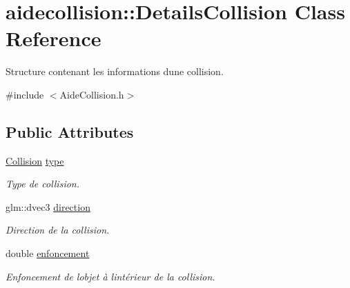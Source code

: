 \hypertarget{classaidecollision_1_1_details_collision}{}\section{aidecollision\+:\+:Details\+Collision Class Reference}
\label{classaidecollision_1_1_details_collision}


Structure contenant les informations d\textquotesingle{}une collision.  




{\ttfamily \#include $<$Aide\+Collision.\+h$>$}

\subsection*{Public Attributes}
\begin{DoxyCompactItemize}
\item 
\hypertarget{classaidecollision_1_1_details_collision_a524989691331ea39d2c14c639f0de02e}{}\hyperlink{namespaceaidecollision_a1c8613e2393aa3268262f9d23d60c0c9}{Collision} \hyperlink{classaidecollision_1_1_details_collision_a524989691331ea39d2c14c639f0de02e}{type}\label{classaidecollision_1_1_details_collision_a524989691331ea39d2c14c639f0de02e}

\begin{DoxyCompactList}\small\item\em Type de collision. \end{DoxyCompactList}\item 
\hypertarget{classaidecollision_1_1_details_collision_ab68965d1c0583cc9a28973bc5b3060b8}{}glm\+::dvec3 \hyperlink{classaidecollision_1_1_details_collision_ab68965d1c0583cc9a28973bc5b3060b8}{direction}\label{classaidecollision_1_1_details_collision_ab68965d1c0583cc9a28973bc5b3060b8}

\begin{DoxyCompactList}\small\item\em Direction de la collision. \end{DoxyCompactList}\item 
\hypertarget{classaidecollision_1_1_details_collision_a6aa4cae3f313a2a16608dd60da0f97d1}{}double \hyperlink{classaidecollision_1_1_details_collision_a6aa4cae3f313a2a16608dd60da0f97d1}{enfoncement}\label{classaidecollision_1_1_details_collision_a6aa4cae3f313a2a16608dd60da0f97d1}

\begin{DoxyCompactList}\small\item\em Enfoncement de l\textquotesingle{}objet à l\textquotesingle{}intérieur de la collision. \end{DoxyCompactList}\end{DoxyCompactItemize}



